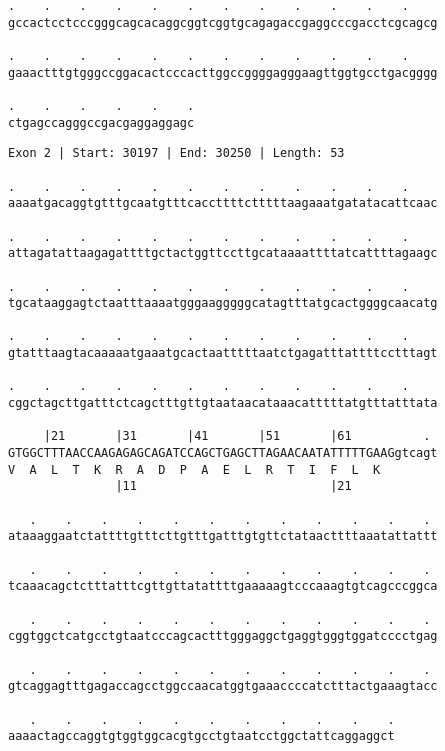 \documentclass{article}
\begin{document}
\newpage
\begin{Verbatim}[fontfamily=courier]
.    .    .    .    .    .    .    .    .    .    .    .    
gccactcctcccgggcagcacaggcggtcggtgcagagaccgaggcccgacctcgcagcg

.    .    .    .    .    .    .    .    .    .    .    .    
gaaactttgtgggccggacactcccacttggccggggagggaagttggtgcctgacgggg

.    .    .    .    .    .
ctgagccagggccgacgaggaggagc
\end{Verbatim}
\newpage
\begin{Verbatim}[fontfamily=courier]
Exon 2 | Start: 30197 | End: 30250 | Length: 53

.    .    .    .    .    .    .    .    .    .    .    .    
aaaatgacaggtgtttgcaatgtttcaccttttctttttaagaaatgatatacattcaac

.    .    .    .    .    .    .    .    .    .    .    .    
attagatattaagagattttgctactggttccttgcataaaattttatcattttagaagc

.    .    .    .    .    .    .    .    .    .    .    .    
tgcataaggagtctaatttaaaatgggaagggggcatagtttatgcactggggcaacatg

.    .    .    .    .    .    .    .    .    .    .    .    
gtatttaagtacaaaaatgaaatgcactaatttttaatctgagatttattttcctttagt

.    .    .    .    .    .    .    .    .    .    .    .    
cggctagcttgatttctcagctttgttgtaataacataaacatttttatgtttatttata

     |21       |31       |41       |51       |61          . 
GTGGCTTTAACCAAGAGAGCAGATCCAGCTGAGCTTAGAACAATATTTTTGAAGgtcagt
V  A  L  T  K  R  A  D  P  A  E  L  R  T  I  F  L  K        
               |11                           |21            

   .    .    .    .    .    .    .    .    .    .    .    . 
ataaaggaatctattttgtttcttgtttgatttgtgttctataacttttaaatattattt

   .    .    .    .    .    .    .    .    .    .    .    . 
tcaaacagctctttatttcgttgttatattttgaaaaagtcccaaagtgtcagcccggca

   .    .    .    .    .    .    .    .    .    .    .    . 
cggtggctcatgcctgtaatcccagcactttgggaggctgaggtgggtggatcccctgag

   .    .    .    .    .    .    .    .    .    .    .    . 
gtcaggagtttgagaccagcctggccaacatggtgaaaccccatctttactgaaagtacc

   .    .    .    .    .    .    .    .    .    .    .
aaaactagccaggtgtggtggcacgtgcctgtaatcctggctattcaggaggct
\end{Verbatim}
\end{document}
